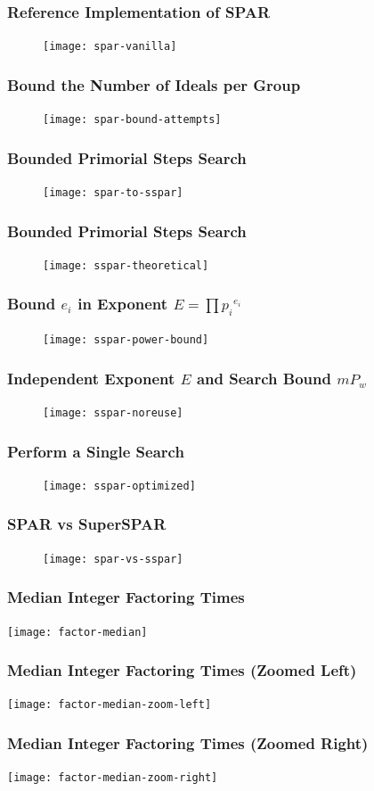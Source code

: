 \documentclass{beamer}
\begin{document}
\begin{frame}
\frametitle{Reference Implementation of SPAR}
\begin{figure}
\texttt{[image: spar-vanilla]}
\end{figure}
\end{frame}
\begin{frame}
\frametitle{Bound the Number of Ideals per Group}
\begin{figure}
\texttt{[image: spar-bound-attempts]}
\end{figure}
\end{frame}
\begin{frame}
\frametitle{Bounded Primorial Steps Search}
\begin{figure}
\texttt{[image: spar-to-sspar]}
\end{figure}
\end{frame}
\begin{frame}
\frametitle{Bounded Primorial Steps Search}
\begin{figure}
\texttt{[image: sspar-theoretical]}
\end{figure}
\end{frame}
\begin{frame}
\frametitle{Bound $e_i$ in Exponent $E = \prod {p_i}^{e_i}$}
\begin{figure}
\texttt{[image: sspar-power-bound]}
\end{figure}
\end{frame}
\begin{frame}
\frametitle{Independent Exponent $E$ and Search Bound $mP_w$}
\begin{figure}
\texttt{[image: sspar-noreuse]}
\end{figure}
\end{frame}
\begin{frame}
\frametitle{Perform a Single Search}
\begin{figure}
\texttt{[image: sspar-optimized]}
\end{figure}
\end{frame}
\begin{frame}
\frametitle{SPAR vs SuperSPAR}
\begin{figure}
\texttt{[image: spar-vs-sspar]}
\end{figure}
\end{frame}


\begin{frame}
\frametitle{Median Integer Factoring Times}
\texttt{[image: factor-median]}
\end{frame}
\begin{frame}
\frametitle{Median Integer Factoring Times (Zoomed Left)}
\texttt{[image: factor-median-zoom-left]}
\end{frame}
\begin{frame}
\frametitle{Median Integer Factoring Times (Zoomed Right)}
\texttt{[image: factor-median-zoom-right]}
\end{frame}
\end{document}
